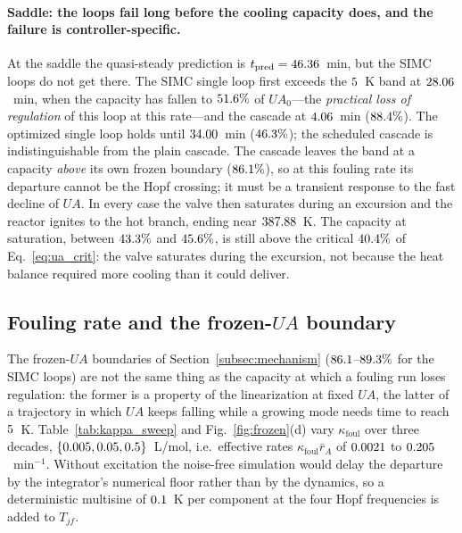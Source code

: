 \paragraph{Saddle: the loops fail long before the cooling capacity does, and the failure is controller-specific.} At the saddle the quasi-steady prediction is $t_{\mathrm{pred}}=46.36$~min, but the SIMC loops do not get there. The SIMC single loop first exceeds the $5$~K band at $28.06$~min, when the capacity has fallen to $51.6\%$ of $UA_0$---the \emph{practical loss of regulation} of this loop at this rate---and the cascade at $4.06$~min ($88.4\%$). The optimized single loop holds until $34.00$~min ($46.3\%$); the scheduled cascade is indistinguishable from the plain cascade. The cascade leaves the band at a capacity \emph{above} its own frozen boundary ($86.1\%$), so at this fouling rate its departure cannot be the Hopf crossing; it must be a transient response to the fast decline of $UA$. In every case the valve then saturates during an excursion and the reactor ignites to the hot branch, ending near $387.88$~K. The capacity at saturation, between $43.3\%$ and $45.6\%$, is still above the critical $40.4\%$ of Eq.~\eqref{eq:ua_crit}: the valve saturates during the excursion, not because the heat balance required more cooling than it could deliver.

\subsection{Fouling rate and the frozen-$UA$ boundary}
\label{subsec:res_sweep}
The frozen-$UA$ boundaries of Section~\ref{subsec:mechanism} ($86.1$--$89.3\%$ for the SIMC loops) are not the same thing as the capacity at which a fouling run loses regulation: the former is a property of the linearization at fixed $UA$, the latter of a trajectory in which $UA$ keeps falling while a growing mode needs time to reach $5$~K. Table~\ref{tab:kappa_sweep} and Fig.~\ref{fig:frozen}(d) vary $\kappa_{\mathrm{foul}}$ over three decades, $\{0.005,0.05,0.5\}$~L/mol, i.e.\ effective rates $\kappa_{\mathrm{foul}}\bar r_A$ of $0.0021$ to $0.205$~min$^{-1}$. Without excitation the noise-free simulation would delay the departure by the integrator's numerical floor rather than by the dynamics, so a deterministic multisine of $0.1$~K per component at the four Hopf frequencies is added to $T_{jf}$.

